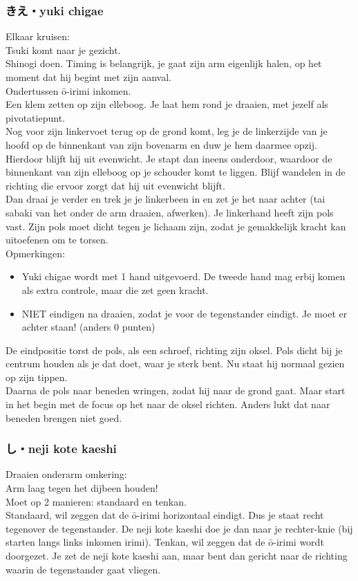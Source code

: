 \subsubsection{きえ・yuki chigae}
Elkaar kruisen:\\
Tsuki komt naar je gezicht.\\
Shinogi doen. Timing is belangrijk, je gaat zijn arm eigenlijk halen, op het moment dat hij begint met zijn aanval.\\
Ondertussen \={o}-irimi inkomen.\\
Een klem zetten op zijn elleboog. Je laat hem rond je draaien, met jezelf als pivotatiepunt.\\
Nog voor zijn linkervoet terug op de grond komt, leg je de linkerzijde van je hoofd op de binnenkant van zijn bovenarm en duw je hem daarmee opzij. Hierdoor blijft hij uit evenwicht. Je stapt dan ineens onderdoor, waardoor de binnenkant van zijn elleboog op je schouder komt te liggen. Blijf wandelen in de richting die ervoor zorgt dat hij uit evenwicht blijft.\\
Dan draai je verder en trek je je linkerbeen in en zet je het naar achter (tai sabaki van het onder de arm draaien, afwerken). Je linkerhand heeft zijn pols vast. Zijn pols moet dicht tegen je lichaam zijn, zodat je gemakkelijk kracht kan uitoefenen om te torsen.\\
Opmerkingen:
\begin{itemize}
    \item Yuki chigae wordt met 1 hand uitgevoerd. De tweede hand mag erbij komen als extra controle, maar die zet geen kracht.
    \item NIET eindigen na draaien, zodat je voor de tegenstander eindigt. Je moet er achter staan! (anders 0 punten)
\end{itemize}
De eindpositie torst de pols, als een schroef, richting zijn oksel. Pols dicht bij je centrum houden als je dat doet, waar je sterk bent. Nu staat hij normaal gezien op zijn tippen.\\
Daarna de pols naar beneden wringen, zodat hij naar de grond gaat. Maar start in het begin met de focus op het naar de oksel richten. Anders lukt dat naar beneden brengen niet goed.

\subsubsection{し・neji kote kaeshi}
Draaien onderarm omkering:\\
Arm laag tegen het dijbeen houden!\\
Moet op 2 manieren: standaard en tenkan.\\
Standaard, wil zeggen dat de \={o}-irimi horizontaal eindigt. Dus je staat recht tegenover de tegenstander. De neji kote kaeshi doe je dan naar je rechter-knie (bij starten langs links inkomen irimi).
Tenkan, wil zeggen dat de \={o}-irimi wordt doorgezet. Je zet de neji kote kaeshi aan, maar bent dan gericht naar de richting waarin de tegenstander gaat vliegen.

